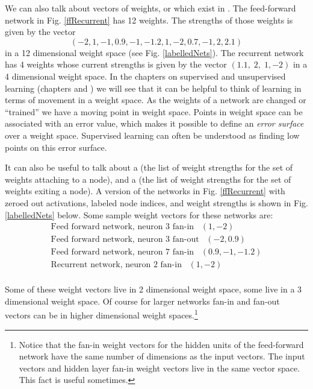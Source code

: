 We can also talk about vectors of weights, or  which exist in . The feed-forward network in Fig. \ref{ffRecurrent} has 12 weights. The strengths of those weights is given by the vector 
\begin{equation*}
(-2, 1, -1, 0.9, -1, -1.2, 1, -2, 0.7, -1, 2, 2.1)
\end{equation*}
in a 12 dimensional weight space (see Fig. \ref{labelledNets}). The recurrent network has 4 weights whose current strengths is given by the vector $(1.1,\; 2,\; 1,-2)$ in a 4 dimensional weight space. In the chapters on supervised and unsupervised learning (chapters  and ) we will see that it can be helpful to think of learning in terms of movement in a weight space. As the weights of a network are changed or ``trained'' we have a moving point in weight space. Points in weight space can be associated with an error value, which makes it possible to define an \emph{error surface} over a weight space. Supervised learning can often be understood as finding low points on this error surface.

It can also be useful to talk about a  (the list of weight strengths for the set of weights attaching to a node), and a  (the list of weight strengths for the set of weights exiting a node). A version of the networks in Fig. \ref{ffRecurrent} with zeroed out activations, labeled node indices, and weight strengths  is shown in Fig. \ref{labelledNets} below. Some sample weight vectors for these networks are:
\begin{eqnarray*}
\mbox{Feed forward network, neuron 3 fan-in} \;  \;  \;  (1,-2) \\
\mbox{Feed forward network, neuron 3 fan-out} \; \; \; (-2,0.9) \\
\mbox{Feed forward network, neuron 7 fan-in} \; \; \;  (0.9,-1,-1.2) \\
\mbox{Recurrent network, neuron 2 fan-in} \; \; \; (1,-2) \\
\end{eqnarray*}

Some of these weight vectors live in 2 dimensional weight space, some live in a 3 dimensional weight space. Of course for larger networks fan-in and fan-out vectors can be in higher dimensional weight spaces.\footnote{Notice that the fan-in weight vectors for the hidden units of the feed-forward network have the same number of dimensions as the input vectors. The input vectors and hidden layer fan-in weight vectors live in the same vector space. This fact is useful sometimes.}

